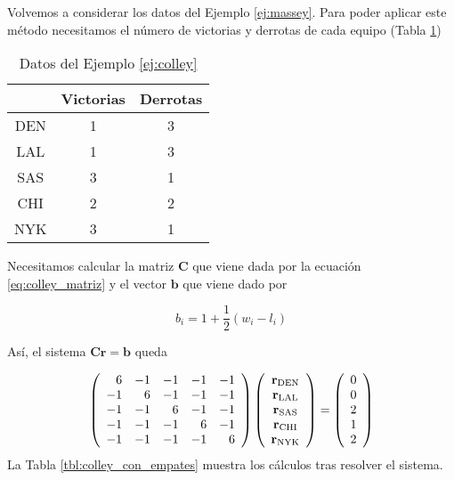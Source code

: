 \begin{ejemplo} \label{ej:colley}
Volvemos a considerar los datos del Ejemplo \ref{ej:massey}. Para poder aplicar este método necesitamos el número de victorias y derrotas de cada equipo (Tabla \ref{tbl:colley})

\begin{table}[h]
\centering
\caption{Datos del Ejemplo \ref{ej:colley}}
\label{tbl:colley}
\begin{tabular}{@{}ccc@{}}
\cmidrule(l){2-3}
    & Victorias & Derrotas \\ \midrule
DEN & 1         & 3        \\
LAL & 1         & 3        \\
SAS & 3         & 1        \\
CHI & 2         & 2        \\
NYK & 3         & 1        \\ \bottomrule
\end{tabular}
\end{table}

Necesitamos calcular la matriz $\mathbf{C}$ que viene dada por la ecuación \ref{eq:colley_matriz} y el vector $\mathbf{b}$ que viene dado por

\begin{equation*}
b_i = 1 + \dfrac{1}{2}\left(w_i - l_i\right)
\end{equation*}

Así, el sistema $\mathbf{C r} = \mathbf{b}$ queda

\begin{equation*}
\left(\begin{array}{r r r r r}
 6 & -1 & -1 & -1 & -1\\
-1 &  6 & -1 & -1 & -1\\
-1 & -1 &  6 & -1 & -1\\
-1 & -1 & -1 &  6 & -1\\
-1 & -1 & -1 & -1 &  6
\end{array}\right)
\left(\begin{array}{c}
\mathbf{r}_{\text{DEN}}\\
\mathbf{r}_{\text{LAL}}\\
\mathbf{r}_{\text{SAS}}\\
\mathbf{r}_{\text{CHI}}\\
\mathbf{r}_{\text{NYK}}
\end{array}\right)
=
\left(\begin{array}{c}
0\\
0\\
2\\
1\\
2
\end{array}\right)
\end{equation*}
La Tabla \ref{tbl:colley_con_empates} muestra los cálculos tras resolver el sistema.


\end{ejemplo}
